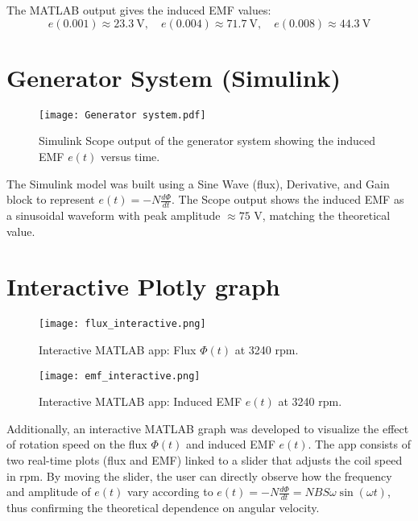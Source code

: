 \documentclass{article}
\begin{document}
The MATLAB output gives the induced EMF values:
\[
e(0.001) \approx 23.3~\text{V}, \quad
e(0.004) \approx 71.7~\text{V}, \quad
e(0.008) \approx 44.3~\text{V}
\]


\section{Generator System (Simulink)}

\begin{figure}[H]
    \centering
    \texttt{[image: Generator system.pdf]}
    \caption{Simulink Scope output of the generator system showing the induced EMF $e(t)$ versus time.}
    \label{fig:simulink_emf}

\end{figure}
\noindent
The Simulink model was built using a Sine Wave (flux), Derivative, and Gain block to represent $e(t)=-N \frac{d\Phi}{dt}$. 
The Scope output shows the induced EMF as a sinusoidal waveform with peak amplitude $\approx 75$ V, matching the theoretical value.

 \vspace{+4cm}


\section{Interactive Plotly graph}
\begin{figure}[H]
    \centering
    \texttt{[image: flux\_interactive.png]}
    \caption{Interactive MATLAB app: Flux $\Phi(t)$ at 3240 rpm.}
    \label{fig:interactive_flux}
\end{figure}

\begin{figure}[H]
    \centering
    \texttt{[image: emf\_interactive.png]}
    \caption{Interactive MATLAB app: Induced EMF $e(t)$ at 3240 rpm.}
    \label{fig:interactive_emf}
\end{figure}

\noindent
Additionally, an interactive MATLAB graph was developed to visualize the effect of rotation speed on the flux $\Phi(t)$ and induced EMF $e(t)$. 
The app consists of two real-time plots (flux and EMF) linked to a slider that adjusts the coil speed in rpm. 
By moving the slider, the user can directly observe how the frequency and amplitude of $e(t)$ vary according to 
$e(t) = -N \tfrac{d\Phi}{dt} = NBS\omega \sin(\omega t)$, thus confirming the theoretical dependence on angular velocity.
\end{document}
